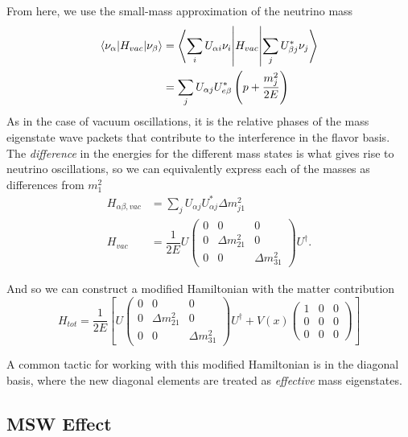 \documentclass[main.tex]{subfiles}
\begin{document}
From here, we use the small-mass approximation of the neutrino mass
\begin{align} 
    \left< \nu_{\alpha} | H_{vac} | \nu_{\beta}  \right> &= \left<  \sum_{i} U_{\alpha i} \nu_{i} \middle| H_{vac} \middle| \sum_{j} U_{\beta j}^{*}\nu_{j} \right>  \\
    &=  \sum\limits_{j} U_{\alpha j} U^{*}_{e\beta}\left( p + \dfrac{m_{j}^{2}}{2E} \right)
\end{align}
As in the case of vacuum oscillations, it is the relative phases of the mass eigenstate wave packets that contribute to the interference in the flavor basis. 
The \textit{difference} in the energies for the different mass states is what gives rise to neutrino oscillations, so we can equivalently express each of the masses as differences from $m_{1}^{2}$ 
\begin{align}
    H_{\alpha \beta, vac } &= \sum\limits_{j} U_{\alpha j} U^{*}_{\alpha j} \Delta m^{2}_{j1}\\
    H_{vac }&= \dfrac{1}{2E} U\left(\begin{array}{ccc} 0 & 0 & 0 \\ 0 & \Delta m_{21}^{2} & 0 \\ 0 & 0 & \Delta m_{31}^{2} \end{array}\right)U^{\dag}. \label{eq:hamy}
\end{align}

And so we can construct a modified Hamiltonian with the matter contribution 
\begin{equation}
    H_{tot }= \dfrac{1}{2E} \left[ U\left(\begin{array}{ccc} 0 & 0 & 0 \\ 0 & \Delta m_{21}^{2} & 0 \\ 0 & 0 & \Delta m_{31}^{2} \end{array}\right)U^{\dag} + V(x)\left(\begin{array}{ccc} 1&0&0\\0&0&0 \\0&0&0 \end{array}\right)  \right]
\end{equation}

A common tactic for working with this modified Hamiltonian is in the diagonal basis, where the new diagonal elements are treated as \textit{effective} mass eigenstates. 


\subsection{MSW Effect}
\end{document}
